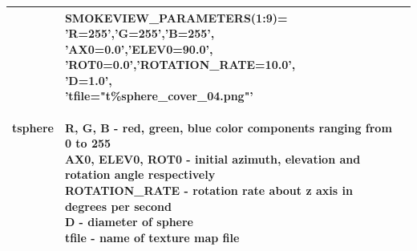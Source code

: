\begin{longtable}[ht]{|l|l|c|}
{\ct tsphere} &
\parbox[c]{\boxwidth}{
    {\ct SMOKEVIEW\_PARAMETERS(1:9)=}\\
    {\ct 'R=255','G=255','B=255',}\\
    {\ct 'AX0=0.0','ELEV0=90.0',}\\
    {\ct 'ROT0=0.0','ROTATION\_RATE=10.0',}\\
    {\ct 'D=1.0',}\\
    {\ct 'tfile="t\%sphere\_cover\_04.png"'}\\ \\
R, G, B - red, green, blue color components ranging from 0 to 255\\
AX0, ELEV0, ROT0 - initial azimuth, elevation and rotation angle respectively\\
ROTATION\_RATE - rotation rate about z axis in degrees per second\\
D - diameter of sphere \\
tfile - name of texture map file

} &
 \\ \hline


\end{longtable}
